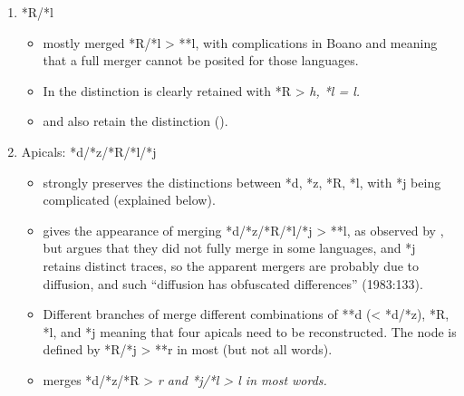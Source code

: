 \begin{enumerate}
\begin{itemize}[topsep=0pt,leftmargin=\dimexpr 15pt-6pt]
						with **d the likely outcome in ,
						but **r in  and .
						 has **r/*l > **l in many branches.
						See  above, as well as  and .
		\end{itemize}
	\item	*R/*l
		\begin{itemize}[topsep=0pt,leftmargin=\dimexpr 15pt-6pt]
			\item	{} mostly merged *R/*l > **l,
						with complications in Boano
						and  meaning that a full merger cannot be posited for those languages.
			\item	In  the distinction is clearly retained with
						*R > \it{h}, *l = \it{l}.
			\item	{}
						and  also retain the distinction ().
		\end{itemize}
	\item	Apicals: *d/*z/*R/*l/*j
		\begin{itemize}[topsep=0pt,leftmargin=\dimexpr 15pt-6pt]
			\item	{} strongly preserves the distinctions between
						*d, *z, *R, *l, with *j being complicated (explained below).
			\item	{} gives the appearance of merging *d/*z/*R/*l/*j
						> **l, as observed by \citet{Stresemann1927},
						but \citet{Collins1983} argues that they did not fully merge
						in some languages, and *j retains distinct traces,
						so the apparent mergers are probably due to diffusion,
						and such “diffusion has obfuscated differences” (1983:133).
			\item	Different branches of  merge different
						combinations of **d (< *d/*z),
						*R, *l, and *j meaning that four apicals need to be reconstructed.
						The  node is defined by *R/*j > **r in
						most (but not all words).
			\item	{} merges *d/*z/*R > \it{r}
						and *j/*l > \it{l} in most words.
		\end{itemize}
\end{enumerate}

